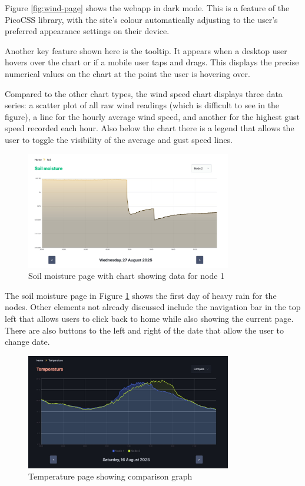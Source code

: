 Figure \ref{fig:wind-page} shows the webapp in dark mode. This is a feature of
the PicoCSS library, with the site's colour automatically adjusting to the
user's preferred appearance settings on their device.

Another key feature shown here is the tooltip. It appears when a desktop user
hovers over the chart or if a mobile user taps and drags. This displays the
precise numerical values on the chart at the point the user is hovering over.

Compared to the other chart types, the wind speed chart displays three data
series: a scatter plot of all raw wind readings (which is difficult to see in
the figure), a line for the hourly average wind speed, and another for the
highest gust speed recorded each hour. Also below the chart there is a legend
that allows the user to toggle the visibility of the average and gust speed
lines.

\begin{figure}[H]
    \centering
    \includegraphics[width=0.8\textwidth]{contents/part-3/fig3/soil-moisture-light.jpg}
    \caption{Soil moisture page with chart showing data for node 1}
    \label{fig:soil-page}
\end{figure}

The soil moisture page in Figure \ref{fig:soil-page} shows the first day of
heavy rain for the nodes. Other elements not already discussed include the
navigation bar in the top left that allows users to click back to home while
also showing the current page. There are also buttons to the left and right of
the date that allow the user to change date.

\begin{figure}[H]
    \centering
    \includegraphics[width=0.8\textwidth]{contents/part-3/fig3/compare-mode.jpg}
    \caption{Temperature page showing comparison graph}
    \label{fig:compare-page}
\end{figure}

